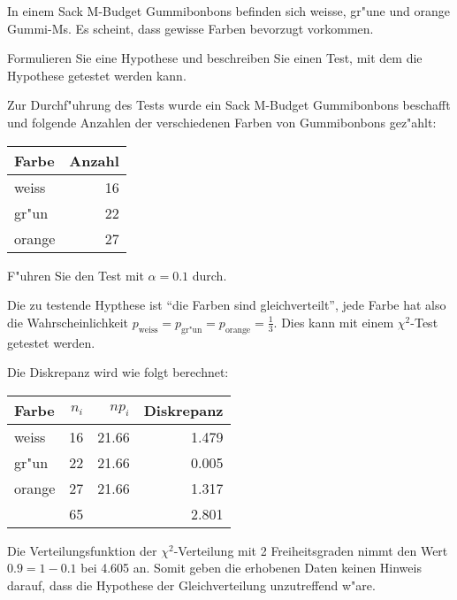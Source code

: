 In einem Sack M-Budget Gummibonbons befinden sich weisse, gr"une und orange
Gummi-Ms. Es scheint, dass gewisse Farben bevorzugt vorkommen.
\begin{teilaufgaben}
\item Formulieren Sie eine Hypothese und beschreiben Sie einen Test, mit
dem die Hypothese getestet werden kann.
\item Zur Durchf"uhrung des Tests wurde ein Sack M-Budget Gummibonbons
beschafft und folgende Anzahlen der verschiedenen Farben von Gummibonbons
gez"ahlt:
\begin{center}
\begin{tabular}{lr}
Farbe&Anzahl\\
\hline
weiss&16\\
gr"un&22\\
orange&27
\end{tabular}
\end{center}
F"uhren Sie den Test mit $\alpha = 0.1$ durch.
\end{teilaufgaben}

\begin{loesung}
\begin{teilaufgaben}
\item Die zu testende Hypthese ist ``die Farben sind gleichverteilt'', jede Farbe
hat also die Wahrscheinlichkeit
$p_{\text{weiss}}=p_{\text{gr"un}}=p_{\text{orange}}=\frac13$. Dies kann
mit einem $\chi^2$-Test getestet werden.
\item Die Diskrepanz wird wie folgt berechnet:
\begin{center}
\begin{tabular}{lrrr}
Farbe&$n_i$&$np_i$&Diskrepanz\\
\hline
weiss&16&21.66&1.479\\
gr"un&22&21.66&0.005\\
orange&27&21.66&1.317\\
\hline
&65&&2.801
\end{tabular}
\end{center}
Die Verteilungsfunktion der $\chi^2$-Verteilung mit 2 Freiheitsgraden nimmt
den Wert $0.9=1-0.1$ bei 4.605 an. Somit geben die erhobenen Daten keinen
Hinweis darauf, dass die Hypothese der Gleichverteilung unzutreffend w"are.
\qedhere
\end{teilaufgaben}
\end{loesung}

